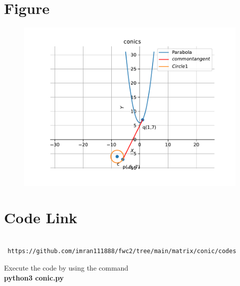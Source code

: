 \documentclass[journal,12pt,twocolumn]{article}
\begin{document}
\section{\textbf{Figure}}
\begin{figure}[h]
    \centering
\includegraphics[width=\columnwidth]{figconic1.pdf}
    \label{fig:my_label}
\end{figure}


\section{\textbf{Code Link}}

\begin{lstlisting}

 https://github.com/imran111888/fwc2/tree/main/matrix/conic/codes

\end{lstlisting}
Execute the code by using the command\\
\textbf{python3 conic.py}
\end{document}
